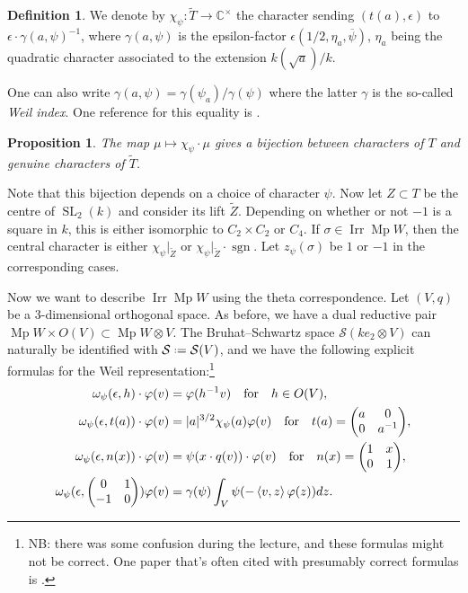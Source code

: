 \documentclass[11pt,a4paper,leqno]{article}
\let\mc\mathcal
\newcommand{\1}{\mathbbm{1}}
\newcommand{\C}{\mathbb{C}}
\newcommand*{\defeq}{\mathrel{\vcenter{\baselineskip0.5ex \lineskiplimit0pt
      \hbox{\scriptsize.}\hbox{\scriptsize.}}}%
  =}
\renewcommand{\bar}{\overline}
\renewcommand{\tilde}{\widetilde}
\renewcommand{\phi}{\varphi}
\DeclareMathOperator{\Irr}{Irr}
\DeclareMathOperator{\sgn}{sgn}
\DeclareMathOperator{\SL}{SL}
\DeclareMathOperator{\Mp}{Mp}
\theoremstyle{plain}
\newtheorem{prop}[theorem]{Proposition}
\theoremstyle{definition}
\newtheorem{definition}[theorem]{Definition}
\theoremstyle{remark}
\numberwithin{equation}{section}
\begin{document}
\begin{definition}
  We denote by $\chi_{\psi} \colon \widetilde T \to \C^{\times}$ the character
  sending $(t(a),\epsilon)$ to $\epsilon \cdot \gamma(a,\psi)^{-1}$, where $\gamma(a,\psi)$ is the
  epsilon-factor $\epsilon(1/2,\eta_{a}, \bar \psi)$, $\eta_{a}$ being the quadratic
  character associated to the extension $k(\sqrt a) /k$. 
\end{definition}
One can also write $\gamma(a,\psi) = \gamma(\psi_{a})/\gamma(\psi)$ where the latter $\gamma$ is
the so-called \emph{Weil index}. One reference for this equality is
\cite{szpruch2018}.

\begin{prop}\label{prop:torus-char}
  The map $\mu \mapsto \chi_{\psi}\cdot \mu$ gives a bijection between characters of $T$
  and genuine characters of $\widetilde T$.
\end{prop}
Note that this bijection depends on a choice of character $\psi$. Now let
$Z \subset T$ be the centre of $\SL_{2}(k)$ and consider its lift
$\widetilde Z$. Depending on whether or not $-1$ is a square in $k$,
this is either isomorphic to $C_{2}\times C_{2}$ or $C_{4}$. If $\sigma \in \Irr
\Mp W$, then the central character is either $\chi_{\psi}|_{\tilde Z}$ or
$\chi_{\psi}|_{\tilde Z} \cdot \sgn$. Let $z_{\psi}(\sigma)$ be $1$ or $-1$ in the
corresponding cases.

Now we want to describe $\Irr \Mp W$ using the theta correspondence.
Let $(V,q)$ be a $3$-dimensional orthogonal space. As before, we have
a dual reductive pair $\Mp W \times O(V) \subset \Mp W\otimes V$. The Bruhat--Schwartz
space $\mc S(ke_{2}\otimes V)$ can naturally be identified with $\mc S
\defeq \mc S(V)$, and we have the following explicit formulas for the
Weil representation:\footnote{NB: there was some confusion during the
  lecture, and these formulas might not be correct. One paper that's
  often cited with presumably correct formulas is \cite{rao1993}.}
 \begin{subequations}
  \begin{align}
    \omega_{\psi}(\epsilon,h) \cdot \phi (v)&= \phi(h^{-1}v) \qq{for} h \in O(V),\\
    \omega_{\psi}(\epsilon,t(a))\cdot \phi(v) &= |a|^{3/2}\chi_{\psi}(a)\phi(v) \qq{for} t(a) =
                          \mqty(a  & 0 \\ 0 & a^{-1}),\\
    \omega_{\psi}(\epsilon, n(x)) \cdot \phi(v) &= \psi(x\cdot q(v))\cdot \phi(v) \qq{for} n(x) = \mqty(1
                        & x \\ 0 & 1),\label{eq:weil-unipot}\\
    \omega_{\psi}(\epsilon, \mqty(0  & 1 \\ -1 & 0))\phi(v) &= \gamma(\psi) \int_{V} \psi(-\left\langle v,z \right\rangle \phi(z))dz.
  \end{align}
\end{subequations}
\end{document}
